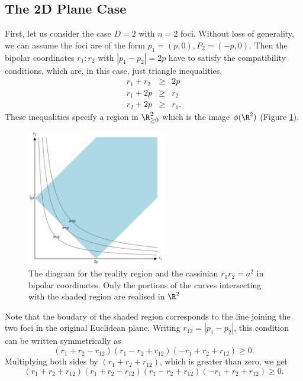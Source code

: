 \documentclass{article}
\begin{document}
\subsection{The 2D Plane Case}
\label{sec:orgdc344cc}
First, let us consider the case \(D=2\) with \(n=2\) foci. Without loss of generality, we can assume the foci are of the form \(p_{1}=(p,0),P_{2}=(-p,0)\).
Then the bipolar coordinates \(r_1 :r_2\) with \(|p_1 -p_2| =2p\) have to satisfy the compatibility conditions,
which are, in this case, just triangle inequalities,
\begin{eqnarray}
 r_1 + r_2 & \ge & 2p \\
 r_1 +2p  & \ge & r_2  \\
 r_2 +2p  & \ge & r_1 .
\end{eqnarray}
These inequalities specify a region in \(\R^2_{\ge0}\) which is the image \(\phi(\R^{2})\) (Figure \ref{fig:bipolar-allowed-region}).
\begin{figure}[h]
\begin{center}
\includegraphics[width=6cm]{images/2cass_bipo.eps}
\caption{The diagram for the reality region and the cassinian $r_1r_2=a^2$ in bipolar coordinates. Only the portions of the curves intersecting with the shaded region are realised in $\R^2$}
\label{fig:bipolar-allowed-region}
\end{center}
\end{figure}
Note that the boudary of the shaded region corresponds to the line joining the two foci in the original Euclidean plane. Writing \(r_{12}=|p_1 -p_2|\), this condition can be written symmetrically as
\begin{equation}
\label{}
(r_1 + r_2 - r_{12})(r_1 - r_2 + r_{12})(-r_1 + r_2 + r_{12}) \ge 0.
\end{equation}
Multiplying both sides by \((r_{1} + r_{2} + r_{12})\), which is greater than zero, we get
\begin{equation}
\label{eq:compat-2D}
(r_1 + r_2 + r_{12})(r_1 + r_2 - r_{12})(r_1 - r_2 + r_{12})(-r_1 + r_2 + r_{12}) \ge 0.
\end{equation}
\end{document}
